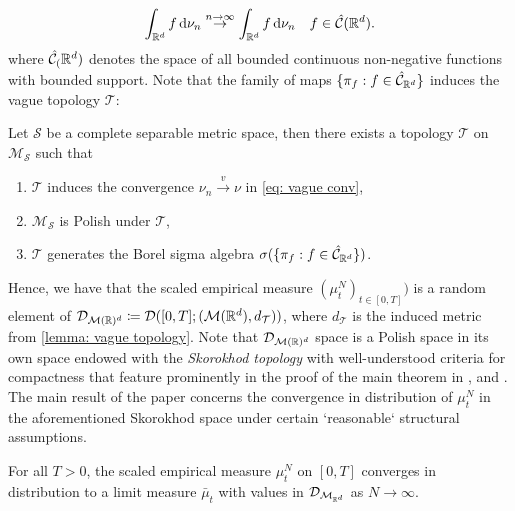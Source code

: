 \documentclass{article}
\begin{document}
\begin{equation}\label{eq: vague conv}
	\int_{\mathbb{R}^{d}}f \operatorname{d}\! \nu_{n}\stackrel{n\to \infty}{\to} \int_{\mathbb{R}^{d}}f \operatorname{d}\! \nu_{n} \quad  f\in \hat{\mathcal{C}}(\mathbb{R}^{d}).
\end{equation}
where $ \hat{\mathcal{C}}_(\mathbb{R}^{d})$ denotes the space of all bounded continuous non-negative functions with bounded support. Note that the family of maps $\{\pi_{f}:f\in \hat {\mathcal{C}}_{\mathbb{R}^{d}}\} $ induces the vague topology $ \mathcal{T}$: 

\begin{boxlemma}\label{lemma: vague topology}
Let $  \mathcal{S}$ be a complete separable metric space, then there exists a topology $  \mathcal{T}$ on $  \mathcal{M}_{ \mathcal{ S}}$ such that
\begin{enumerate}
\item $ \mathcal{T}$ induces the convergence $ \nu_{n}\stackrel{v}{\longrightarrow}\nu$ in \ref{eq: vague conv},
\item $ \mathcal{M}_{ \mathcal{S}}$ is Polish under $  \mathcal{T}$,
\item $  \mathcal{T}$ generates the Borel sigma algebra $\sigma(\{\pi_{f}:f\in \hat {\mathcal{C}}_{\mathbb{R}^{d}}\})$.
\end{enumerate}

\end{boxlemma}

Hence, we have that the scaled empirical measure $ (\mu^{N}_{t})_{t\in [0,T]})$ is a random element of $ \mathcal{D}_{ \mathcal{M}(\mathbb{R})^{d}} \coloneqq \mathcal{D}([0,T]; ( \mathcal{M}(\mathbb{R}^{d}), d_\mathcal{T}))$, where $d_ \mathcal{T}$ is the induced metric from \ref{lemma: vague topology}. Note that $  \mathcal{D}_{ \mathcal{M}(\mathbb{R})^{d}}$ space is a Polish space in its own space endowed with the \textit{Skorokhod topology} with well-understood criteria for compactness that feature prominently in the proof of the main theorem in \cite{sirignano2019meanfieldanalysislln}, and \cite{sirignano2019meanfieldanalysisclt}.\\

The main result of the paper \cite{sirignano2019meanfieldanalysislln} concerns the convergence in distribution of $ \mu^{N}_{t}$ in the aforementioned Skorokhod space under certain `reasonable` structural assumptions.

\begin{theorem}\label{thm: spilopoulos lln}
	For all $ T>0$, the scaled empirical measure $ \mu^{N}_{t}$ on $ [0,T]$ converges in distribution to a
 limit measure $ \bar{\mu}_{t}$ with values in $  \mathcal{D}_{\mathcal{M}_{\mathbb{R}^{d}}} $ as $ N\to \infty$.
\end{theorem}
\end{document}
